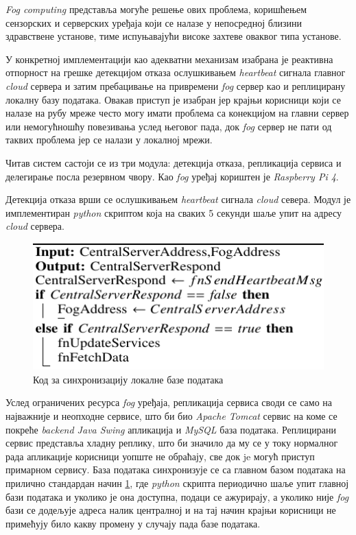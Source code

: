 \textit{Fog computing} представља могуће решење ових проблема, коришћењем сензорских и серверских уређаја који се налазе у непосредној близини здравствене установе, тиме испуњавајући високе захтеве оваквог типа установе.

У конкретној имплементацији као адекватни механизам изабрана је реактивна отпорност на грешке детекцијом отказа ослушкивањем \textit{heartbeat} сигнала главног \textit{cloud} сервера и затим пребацивање на привремени \textit{fog} сервер као и реплицирану локалну базу података. Овакав приступ је изабран јер  крајњи корисници који се налазе на рубу мреже често могу имати проблема са конекцијом на главни сервер или немогућношћу повезивања услед његовог пада, док \textit{fog} сервер не пати од таквих проблема јер се налази у локалној мрежи. 

Читав систем састоји се из три модула: детекција отказа, репликација сервиса и делегирање посла резервном чвору. Као \textit{fog} уређај кориштен је \textit{Raspberry Pi 4}. 

Детекција отказа врши се ослушкивањем \textit{heartbeat} сигнала \textit{cloud} севера. Модул је имплементиран \textit{python} скриптом која на сваких 5 секунди шаље упит на адресу \textit{cloud} сервера. 

\begin{figure}[H]
    \centering
    \includegraphics[width=1\textwidth]{images/db_update.png}
    \caption{Код за синхронизацију локалне базе података}
    \label{fig:db_update}
\end{figure}

Услед ограничених ресурса \textit{fog} уређаја, репликација сервиса своди се само на најважније и неопходне сервисе, што би био \textit{Apache Tomcat} сервис на коме се покреће \textit{backend Java Swing} апликација и \textit{MySQL} база података. Реплицирани сервис представља хладну реплику, што би значило да му се у току нормалног рада апликације корисници уопште не обраћају, све док je могућ приступ примарном сервису. База података синхронизује се са главном базом података на прилично стандардан начин \ref{fig:db_update}, где \textit{python} скрипта периодично шаље упит главној бази података и уколико је она доступна, подаци се ажурирају, а уколико није \textit{fog} бази се додељује адреса налик централној и на тај начин крајњи корисници не примећују било какву промену у случају пада базе података.



